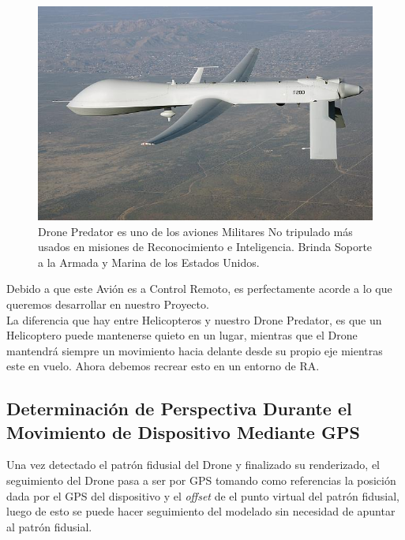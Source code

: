 \documentclass[a4paper]{article}
\begin{document}
\begin{figure}[h!]
  \centering
  \includegraphics[width=0.95\linewidth, keepaspectratio]{predator}
  \caption{Drone Predator es uno de los aviones Militares No tripulado más usados en misiones de Reconocimiento e Inteligencia. Brinda Soporte a la Armada y Marina de los Estados Unidos.}
  \label{fig:Drone Predator}
\end{figure}

Debido a que este Avión es a Control Remoto, es perfectamente acorde a lo que queremos desarrollar en nuestro Proyecto. \\
La diferencia que hay entre Helicopteros y nuestro Drone Predator, es que un Helicoptero puede mantenerse quieto en un lugar, mientras que el Drone mantendrá siempre un movimiento hacia delante desde su propio eje mientras este en vuelo. Ahora debemos recrear esto en un entorno de RA.

\subsection{Determinación de Perspectiva Durante el Movimiento de Dispositivo Mediante GPS}
Una vez detectado el patrón fidusial del Drone y finalizado su renderizado, el seguimiento del Drone pasa a ser por GPS tomando como referencias la posición dada por el GPS del dispositivo y el \textit{offset} de el punto virtual del patrón fidusial, luego de esto se puede hacer seguimiento del modelado sin necesidad de apuntar al patrón fidusial.

\end{document}
